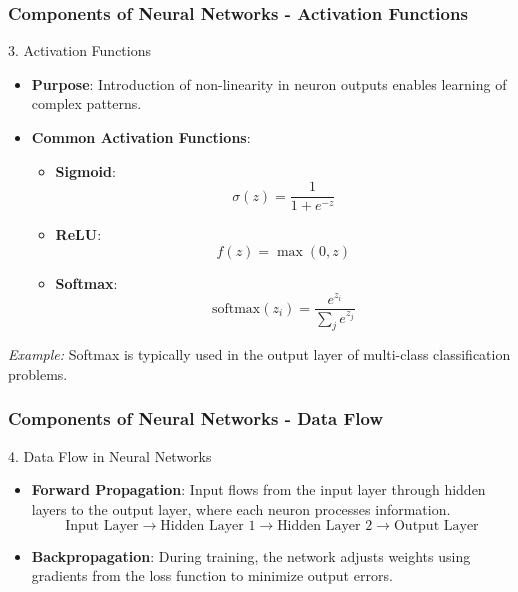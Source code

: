 \documentclass[aspectratio=169]{beamer}
\begin{document}
\begin{frame}[fragile]
    \frametitle{Components of Neural Networks - Activation Functions}
    \begin{block}{3. Activation Functions}
        \begin{itemize}
            \item \textbf{Purpose}: Introduction of non-linearity in neuron outputs enables learning of complex patterns.
            \item \textbf{Common Activation Functions}:
            \begin{itemize}
                \item \textbf{Sigmoid}: 
                \begin{equation}
                \sigma(z) = \frac{1}{1 + e^{-z}}
                \end{equation}
                \item \textbf{ReLU}: 
                \begin{equation}
                f(z) = \max(0, z)
                \end{equation}
                \item \textbf{Softmax}: 
                \begin{equation}
                \text{softmax}(z_i) = \frac{e^{z_i}}{\sum_{j} e^{z_j}}
                \end{equation}
            \end{itemize}
        \end{itemize}
        \textit{Example:} Softmax is typically used in the output layer of multi-class classification problems.
    \end{block}
\end{frame}

\begin{frame}[fragile]
    \frametitle{Components of Neural Networks - Data Flow}
    \begin{block}{4. Data Flow in Neural Networks}
        \begin{itemize}
            \item \textbf{Forward Propagation}: Input flows from the input layer through hidden layers to the output layer, where each neuron processes information.
            \begin{equation}
            \text{Input Layer} \rightarrow \text{Hidden Layer 1} \rightarrow \text{Hidden Layer 2} \rightarrow \text{Output Layer}
            \end{equation}
            \item \textbf{Backpropagation}: During training, the network adjusts weights using gradients from the loss function to minimize output errors.
        \end{itemize}
    \end{block}
\end{frame}
\end{document}
